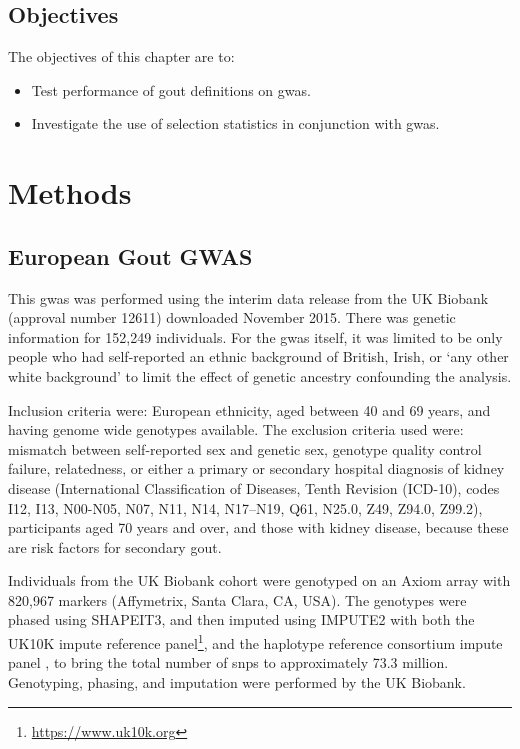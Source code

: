 \documentclass[]{report}
\providecommand{\tightlist}{%
  \setlength{\itemsep}{0pt}\setlength{\parskip}{0pt}}
\begin{document}
\subsection{Objectives}\label{objectives-2}

The objectives of this chapter are to:

\begin{itemize}
\tightlist
\item
  Test performance of gout definitions on \gls{gwas}.
\item
  Investigate the use of selection statistics in conjunction with
  \gls{gwas}.
\end{itemize}

\section{Methods}\label{methods-2}

\subsection{European Gout GWAS}\label{ukbbgwas}

This \gls{gwas} was performed using the interim data release from the UK
Biobank (approval number 12611) downloaded November 2015. There was
genetic information for 152,249 individuals. For the \gls{gwas} itself,
it was limited to be only people who had self-reported an ethnic
background of British, Irish, or `any other white background' to limit
the effect of genetic ancestry confounding the analysis.

Inclusion criteria were: European ethnicity, aged between 40 and 69
years, and having genome wide genotypes available. The exclusion
criteria used were: mismatch between self-reported sex and genetic sex,
genotype quality control failure, relatedness, or either a primary or
secondary hospital diagnosis of kidney disease (International
Classification of Diseases, Tenth Revision (ICD-10), codes I12, I13,
N00-N05, N07, N11, N14, N17--N19, Q61, N25.0, Z49, Z94.0, Z99.2),
participants aged 70 years and over, and those with kidney disease,
because these are risk factors for secondary gout.

Individuals from the UK Biobank cohort were genotyped on an Axiom array
with 820,967 markers (Affymetrix, Santa Clara, CA, USA). The genotypes
were phased using SHAPEIT3, and then imputed using IMPUTE2 with both the
UK10K impute reference panel\footnote{\url{https://www.uk10k.org}}, and
the haplotype reference consortium impute panel \citep{McCarthy2016}, to
bring the total number of \glspl{snp} to approximately 73.3 million.
Genotyping, phasing, and imputation were performed by the UK Biobank.
\end{document}
